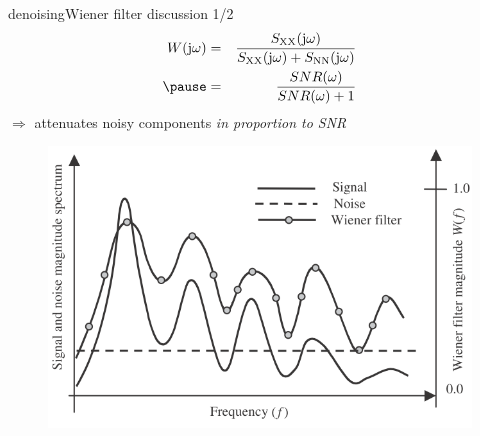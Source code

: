 	\begin{frame}{denoising}{Wiener filter discussion 1/2}
      \vspace{-3mm} \begin{eqnarray*}
            W(\jom) &=& \frac{S_\mathrm{XX}(\jom)}{{S}_\mathrm{XX}(\jom) + {S}_\mathrm{NN}(\jom)}\\
            \pause
            &=& \frac{SNR(\omega)}{SNR(\omega) + 1}
        \end{eqnarray*}
        \smallskip
        $\Rightarrow$ attenuates noisy components \textit{in proportion to SNR}
        \begin{figure}
            \includegraphics[scale=.4]{graph/Wiener}
        \end{figure}
 	\end{frame}

